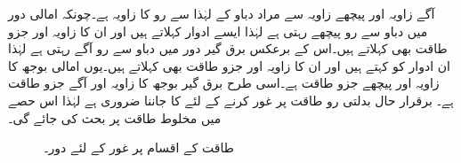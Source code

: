 آگے زاویہ اور پیچھے زاویہ سے مراد دباو کے لہٰذا سے رو کا زاویہ ہے۔چونکہ امالی دور میں دباو سے رو پیچھے رہتی ہے لہٰذا ایسے ادوار  کہلاتے ہیں اور ان کا زاویہ اور جزو طاقت بھی  کہلاتے ہیں۔اس کے برعکس برق گیر دور میں دباو سے رو آگے رہتی ہے لہٰذا ان ادوار کو  کہتے ہیں اور ان کا زاویہ اور جزو طاقت بھی  کہلاتے ہیں۔یوں امالی بوجھ  کا زاویہ   اور پیچھے جزو طاقت  ہے۔اسی طرح برق گیر بوجھ  کا زاویہ  اور آگے جزو طاقت  ہے۔
برقرار حال بدلتی رو طاقت پر غور کرنے کے لئے  کا جاننا ضروری ہے لہٰذا اس حصے میں مخلوط طاقت پر بحث کی جائے گی۔   
\begin{figure}
\centering
{}
\caption{طاقت کے اقسام پر غور کے لئے دور۔}
\label{شکل_طاقت_اقسام_طاقت}
\end{figure}

